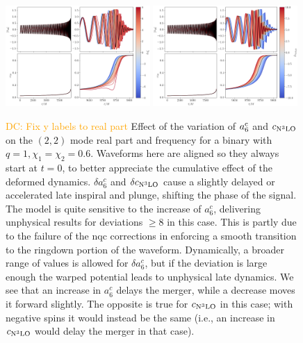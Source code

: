 \documentclass[prd,amssymb,amsmath,amsfonts,nofootinbib,reprint,showpacs,longbibliography]{revtex4-1}
\def\c3{c_{\rm{N}^3\rm{LO}}}
\newcommand{\DC}[1]{{\textcolor{orange}{{DC: #1}} }}
\begin{document}
\begin{figure}
    \includegraphics[width=0.49\textwidth]{figs/delta_a6c_-8.0_8.0.png}
    \includegraphics[width=0.49\textwidth]{figs/delta_cN3LO_-10.0_10.0.png}
    \caption{\label{fig:a6c3} \DC{Fix y labels to real part}
    Effect of the variation of $a_6^{\rm c}$ and $\c3$ on the $(2,2)$ mode real part and frequency
    for a binary with $q = 1, \chi_1 = \chi_2 = 0.6$. Waveforms here are aligned so they always start at $t = 0$,
    to better appreciate the cumulative effect of the deformed dynamics. $\delta a_6^c$ and $\delta \c3$ cause a slightly
    delayed or accelerated late inspiral and plunge, shifting the phase of the signal. The model is quite
    sensitive to the increase of $a_6^c$, delivering unphysical results for deviations $\geq 8$ in this case.
    This is partly due to the failure of the \ac{nqc} corrections in enforcing a smooth transition to the ringdown
    portion of the waveform. Dynamically, a broader range of values is allowed for $\delta a_{6}^c$, but
    if the deviation is large enough the warped potential leads to unphysical late dynamics.
    We see that an increase in $a_6^c$ delays the merger, while a decrease moves it forward slightly. The
    opposite is true for $\c3$ in this case; with negative spins it would instead be the same (i.e.,
    an increase in $\c3$ would delay the merger in that case).}
\end{figure}
\end{document}
